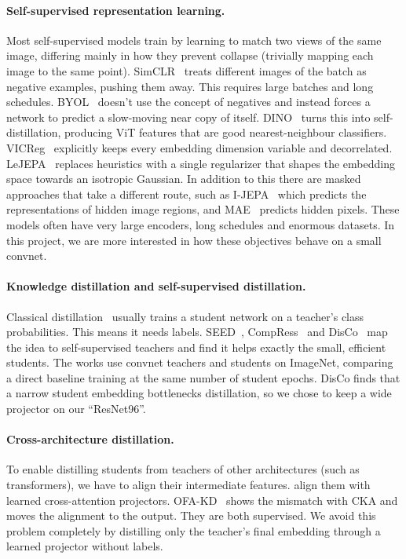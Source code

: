 \documentclass[letterpaper,11pt]{article}
\begin{document}
\paragraph{Self-supervised representation learning.}
Most self-supervised models train by learning to match two views of the same image, differing mainly in how they prevent collapse (trivially mapping each image to the same point).  SimCLR~\citep{chen2020simclr} treats different images of the batch as negative examples, pushing them away. This requires large batches and long schedules. BYOL~\citep{grill2020byol} doesn't use the concept of negatives and instead forces a network to predict a slow-moving near copy of itself. DINO~\citep{caron2021dino} turns this into self-distillation, producing ViT features that are good nearest-neighbour classifiers. VICReg~\citep{bardes2022vicreg} explicitly keeps every embedding dimension variable and decorrelated. LeJEPA~\citep{balestriero2025lejepa} replaces heuristics with a single regularizer that shapes the embedding space towards an isotropic Gaussian. In addition to this there are masked approaches that take a different route, such as I-JEPA~\citep{assran2023ijepa} which predicts the representations of hidden image regions, and MAE~\citep{he2022mae} predicts hidden pixels. These models often have very large encoders, long schedules and enormous datasets. In this project, we are more interested in how these objectives behave on a small convnet.

\paragraph{Knowledge distillation and self-supervised distillation.}
Classical distillation~\citep{hinton2015distilling} usually trains a student network on a teacher's class probabilities. This means it needs labels. SEED~\citep{fang2021seed}, CompRess~\citep{koohpayegani2020compress} and DisCo~\citep{gao2022disco} map the idea to self-supervised teachers and find it helps exactly the small, efficient students. The works use convnet teachers and students on ImageNet, comparing a direct baseline training at the same number of student epochs. DisCo finds that a narrow student embedding bottlenecks distillation, so we chose to keep a wide projector on our ``ResNet96''.

\paragraph{Cross-architecture distillation.}
To enable distilling students from teachers of other architectures (such as transformers), we have to align their intermediate features. \citet{liu2022crossarch} align them with learned cross-attention projectors. OFA-KD~\citep{hao2023ofakd} shows the mismatch with CKA and moves the alignment to the output. They are both supervised. We avoid this problem completely by distilling only the teacher's final embedding through a learned projector without labels.
\end{document}
